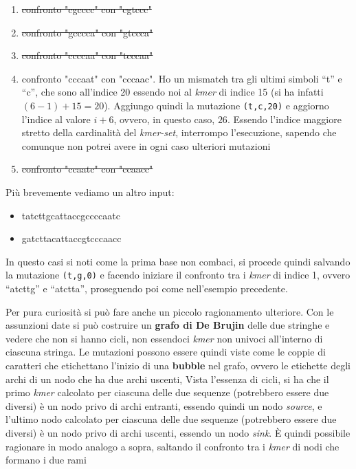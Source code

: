 \documentclass[a4paper,12pt, oneside]{book}
\begin{document}
\begin{esempio}
\begin{enumerate}[start=0]
    \item \sout{confronto "cgcccc" con "cgtccc"}
    \item \sout{confronto "gcccca" con "gtccca"}
    \item \sout{confronto "ccccaa" con "tcccaa"}
    \item confronto "cccaat" con "cccaac". Ho un mismatch tra gli ultimi simboli
    ``t'' e ``c'', che sono all'indice 20 essendo noi al \textit{kmer} di indice
    15 (si ha infatti $(6-1)+15=20$). Aggiungo quindi la mutazione
    \texttt{(t,c,20)} 
    e aggiorno l'indice al valore $i+6$, ovvero, in questo caso, $26$. Essendo
    l'indice maggiore stretto della cardinalità del \textit{kmer-set},
    interrompo l'esecuzione, sapendo che comunque non potrei avere in ogni caso
    ulteriori mutazioni
    \item \sout{confronto "ccaatc" con "ccaacc"}
  \end{enumerate}
\end{esempio}
\begin{esempio}
  Più brevemente vediamo un altro input:
  \begin{itemize}
    \item tatcttgcattaccgccccaatc
    \item gatcttacattaccgtcccaacc
  \end{itemize}
  In questo casi si noti come la prima base non combaci, si procede quindi
  salvando la mutazione \texttt{(t,g,0)} e facendo iniziare il confronto tra i
  \textit{kmer} di indice 1, ovvero ``atcttg'' e ``atctta'', proseguendo poi
  come nell'esempio precedente.
\end{esempio}
Per pura curiosità si può fare anche un piccolo ragionamento ulteriore. Con le
assunzioni date si può costruire un \textbf{grafo di De Brujin} delle due
stringhe e vedere che non si hanno cicli, non essendoci \textit{kmer} non
univoci all'interno di ciascuna stringa. Le mutazioni possono essere quindi
viste come le coppie di caratteri 
che etichettano l'inizio di una \textbf{bubble} nel grafo, ovvero le etichette
degli archi di un nodo che ha due archi uscenti, Vista l'essenza di
cicli, si ha che il primo \textit{kmer} calcolato per ciascuna delle due
sequenze (potrebbero essere due diversi) è un nodo privo di archi entranti,
essendo quindi un nodo \textit{source}, e
l'ultimo nodo calcolato per ciascuna delle due
sequenze (potrebbero essere due diversi) è un nodo privo di archi uscenti,
essendo un nodo \textit{sink}. È quindi possibile ragionare in modo analogo a
sopra, saltando il confronto tra i \textit{kmer} di nodi che formano i due rami
\end{document}
